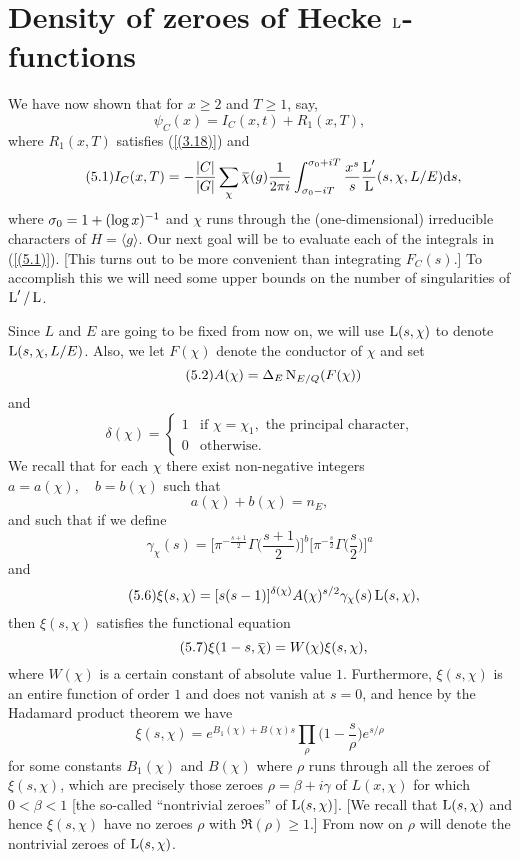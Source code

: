\documentclass[./main]{subfiles}
\begin{document}
\section{Density of zeroes of Hecke \texorpdfstring{$\operatorname{L}$}{L}-functions}\setlength{\headheight}{22.54279pt}
We have now shown that for $x\geq 2$ and $T\geq1$, say,
\[\psi_C(x) = I_C{(x,t)} + R_1(x,T), \]
where $R_1(x,T)$ satisfies (\ref{(3.18)}) and
\[\tag{5.1}\label{(5.1)}I_C(x,T) = -\frac{\small|C\small|}{\small|G\small|}\sum_{\chi}{\xoverline{\chi}(g)\frac{1}{2\pi i}}\int_{\sigma_0-iT}^{\sigma_0+iT}{\frac{x^s}{s}\frac{\L'}{\L}(s,\chi,L/E)\dd{s}}, \]
where $\sigma_0=1+\small(\log{x}\small)^{-1}$ and $\chi$ runs through the (one-dimensional) irreducible characters of $H=\langle g\rangle$. Our next goal will be to evaluate each of the integrals in (\ref{(5.1)}). [This turns out to be more convenient than integrating $F_C(s)$.] To accomplish this we will need some upper bounds on the number of singularities of $\operatorname{L}'/\operatorname{L}$.

Since $L$ and $E$ are going to be fixed from now on, we will use $\operatorname{L}(s,\chi)$ to denote $\operatorname{L}(s,\chi,L/E)$. Also, we let $F(\chi)$ denote the conductor of $\chi$ and set
\[\tag{5.2}\label{(5.2)}A(\chi) = \Delta_E\operatorname{N}_{E/Q}(F(\chi)) \]
and
\[\tag{5.3}\label{(5.3)}\delta(\chi) =
\begin{cases}
1 & \text{if } \chi = \chi_1,\text{ the principal character,} \\
0 & \text{otherwise.}
\end{cases}\]
We recall that for each $\chi$ there exist non-negative integers $a = a(\chi),\quad b=b(\chi)$ such that
\[\tag{5.4}\label{(5.4)}a(\chi)+b(\chi) = n_E,\]
and such that if we define
\[\tag{5.5}\label{(5.5)}\gamma_\chi(s) = \bigg[\pi^{-\frac{s+1}{2}}\Gamma\Big(\frac{s+1}{2}\Big)\bigg]^b\bigg[\pi^{-\frac{s}{2}}\Gamma\Big(\frac{s}{2}\Big)\bigg]^a\]
and
\[\label{(5.6)}\tag{5.6} \xi(s,\chi)= [s(s-1)]^{\delta(\chi)}A(\chi)^{s/2}\gamma_{\chi}(s)\operatorname{L}(s,\chi),\]
then $\xi(s,\chi)$ satisfies the functional equation
\[\label{(5.7)}\tag{5.7}\xi(1-s,\xoverline{\chi}) = W(\chi)\xi(s,\chi),\]
where $W(\chi)$ is a certain constant of absolute value $1$. Furthermore, $\xi(s,\chi)$ is an entire function of order $1$ and does not vanish at $s=0$, and hence by the Hadamard product theorem we have
\[\tag{5.8}\label{(5.8)}\xi(s,\chi) = e^{B_1(\chi)+B(\chi)s} \prod_{\rho}{\Big(1-\frac{s}{\rho}\Big)e^{s/\rho}}\]
for some constants $B_1(\chi)$ and $B(\chi)$ where $\rho$ runs through all the zeroes of $\xi(s,\chi)$, which are precisely those zeroes $\rho = \beta + i\gamma$ of $L(x,\chi)$ for which $0<\beta<1$ [the so-called ``nontrivial zeroes'' of $\operatorname{L}(s,\chi)$]. [We recall that $\operatorname{L}(s,\chi)$ and hence $\xi(s,\chi)$ have no zeroes $\rho$ with $\Re{(\rho)}\geq1$.] From now on $\rho$ will denote the nontrivial zeroes of $\operatorname{L}(s,\chi)$.
\end{document}
